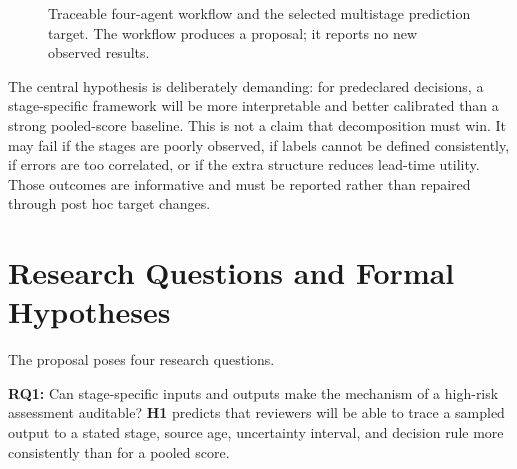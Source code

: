 \documentclass[conference]{IEEEtran}
\begin{document}
\begin{figure}[t]
\centering
{}
\caption{Traceable four-agent workflow and the selected multistage prediction target. The workflow produces a proposal; it reports no new observed results.}
\label{fig:workflow}
\end{figure}

The central hypothesis is deliberately demanding: for predeclared decisions, a stage-specific framework will be more interpretable and better calibrated than a strong pooled-score baseline. This is not a claim that decomposition must win. It may fail if the stages are poorly observed, if labels cannot be defined consistently, if errors are too correlated, or if the extra structure reduces lead-time utility. Those outcomes are informative and must be reported rather than repaired through post hoc target changes.

\section{Research Questions and Formal Hypotheses}

The proposal poses four research questions.

\textbf{RQ1:} Can stage-specific inputs and outputs make the mechanism of a high-risk assessment auditable? \textbf{H1} predicts that reviewers will be able to trace a sampled output to a stated stage, source age, uncertainty interval, and decision rule more consistently than for a pooled score.
\end{document}
